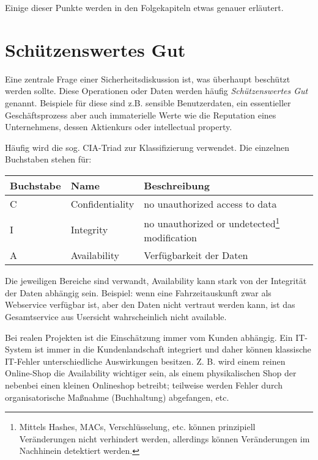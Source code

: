 Einige dieser Punkte werden in den Folgekapiteln etwas genauer erläutert.

\section{Schützenswertes Gut}

Eine zentrale Frage einer Sicherheitsdiskussion ist, was überhaupt beschützt werden sollte. Diese Operationen oder Daten werden häufig \textit{Schützenswertes Gut} genannt. Beispiele für diese sind z.B. sensible Benutzerdaten, ein essentieller Geschäftsprozess aber auch immaterielle Werte wie die Reputation eines Unternehmens, dessen Aktienkurs oder intellectual property.

Häufig wird die sog. CIA-Triad zur Klassifizierung verwendet. Die einzelnen Buchstaben stehen für:

\begin{table}[h!]
	\begin{center}
\begin{tabular}{llp{5cm}}
	\toprule
	Buchstabe & Name & Beschreibung \\
	\midrule
	C & Confidentiality & no unauthorized access to data \\
	I & Integrity & no unauthorized or undetected\footnote{Mittels Hashes, MACs, Verschlüsselung, etc. können prinzipiell Veränderungen nicht verhindert werden, allerdings können Veränderungen im Nachhinein detektiert werden.} modification \\
	A & Availability & Verfügbarkeit der Daten \\
	\bottomrule
\end{tabular}
\end{center}
\end{table}

Die jeweiligen Bereiche sind verwandt, Availability kann stark von der Integrität der Daten abhängig sein. Beispiel: wenn eine Fahrzeitauskunft zwar als Webservice verfügbar ist, aber den Daten nicht vertraut werden kann, ist das Gesamtservice aus Usersicht wahrscheinlich nicht available.

Bei realen Projekten ist die Einschätzung immer vom Kunden abhängig. Ein IT-System ist immer in die Kundenlandschaft integriert und daher können klassische IT-Fehler unterschiedliche Auswirkungen besitzen. Z. B. wird einem reinen Online-Shop die Availability wichtiger sein, als einem physikalischen Shop der nebenbei einen kleinen Onlineshop betreibt; teilweise werden Fehler durch organisatorische Maßnahme (Buchhaltung) abgefangen, etc.


